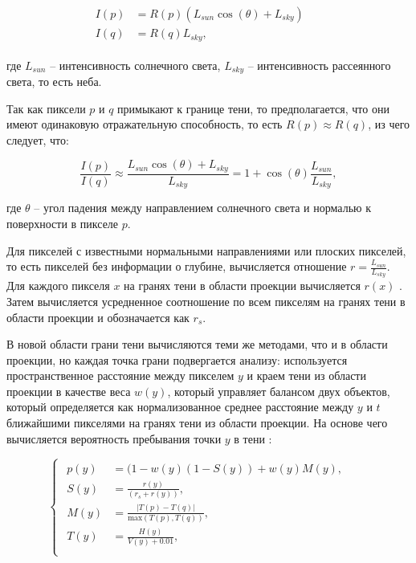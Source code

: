 \begin{equation}
	\begin{aligned}
		\begin{split}
			I(p) &= R(p)(L_{sun} \cos(\theta) + L_{sky}) &&\\
			I(q) &= R(q)L_{sky}, &&
		\end{split}
	\end{aligned}
\end{equation}

где $L_{sun}$ -- интенсивность солнечного света, $L_{sky}$ -- интенсивность рассеянного света, то есть неба.

Так как пиксели $p$ и $q$ примыкают к границе тени, то предполагается, что они имеют одинаковую отражательную способность, то есть $R(p) \approx R(q)$, из чего следует, что:

\begin{equation}
	\frac{I(p)}{I(q)} \approx \frac{L_{sun} \cos(\theta) + L_{sky}}{L_{sky}} = 1 + \cos(\theta)\frac{L_{sun}}{L_{sky}},
\end{equation}

где $\theta$ -- угол падения между направлением солнечного света и нормалью к поверхности в пикселе $p$.

Для пикселей с известными нормальными направлениями или плоских пикселей, то есть пикселей без информации о глубине, вычисляется отношение $r = \frac{L_{sun}}{L_{sky}}$. Для каждого пикселя $x$ на гранях тени в области проекции вычисляется $r(x)$ . Затем вычисляется усредненное соотношение по всем пикселям на гранях тени в области проекции и обозначается как $r_s$.

В новой области грани тени вычисляются теми же методами, что и в области проекции, но каждая точка грани подвергается анализу: используется пространственное расстояние между пикселем $y$ и краем тени из области проекции в качестве веса $w(y)$, который управляет балансом двух объектов, который определяется как нормализованное среднее расстояние между $y$ и $t$ ближайшими пикселями на гранях тени из области проекции. На основе чего вычисляется вероятность пребывания точки $y$ в тени \cite{wei2019simulating}:

\begin{equation}
	\begin{cases}
		\begin{aligned}
			p(y) &= (1 - w(y)(1 - S(y)) + w(y)M(y), &&\\
			S(y) &= \frac{r(y)}{(r_s + r(y))}, &&\\
			M(y) &= \frac{|T(p) - T(q)|}{\text{max}(T(p), T(q))}, &&\\
			T(y) &= \frac{H(y)}{V(y) + 0.01}, &&\\
		\end{aligned}
	\end{cases}
\end{equation}


